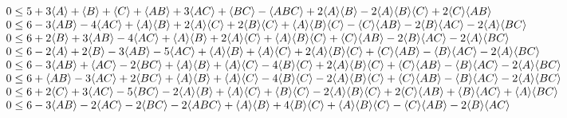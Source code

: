 \begin{align*}
\begin{array}{l}
 0
\leq
{5 + 3 \langle A\rangle + \langle B\rangle + \langle C\rangle + \langle A B\rangle + 3 \langle A C\rangle + \langle B C\rangle -\langle A B C\rangle + 2 \langle A\rangle \langle B\rangle -2 \langle A\rangle \langle B\rangle \langle C\rangle + 2 \langle C\rangle \langle A B\rangle} \\
 0
\leq
{6 -3 \langle A B\rangle -4 \langle A C\rangle + \langle A\rangle \langle B\rangle + 2 \langle A\rangle \langle C\rangle + 2 \langle B\rangle \langle C\rangle + \langle A\rangle \langle B\rangle \langle C\rangle -\langle C\rangle \langle A B\rangle -2 \langle B\rangle \langle A C\rangle -2 \langle A\rangle \langle B
   C\rangle} \\
 0
\leq
{6 + 2 \langle B\rangle + 3 \langle A B\rangle -4 \langle A C\rangle + \langle A\rangle \langle B\rangle + 2 \langle A\rangle \langle C\rangle + \langle A\rangle \langle B\rangle \langle C\rangle + \langle C\rangle \langle A B\rangle -2 \langle B\rangle \langle A C\rangle -2 \langle A\rangle \langle B C\rangle} \\
 0
\leq
{6 -2 \langle A\rangle + 2 \langle B\rangle -3 \langle A B\rangle -5 \langle A C\rangle + \langle A\rangle \langle B\rangle + \langle A\rangle \langle C\rangle + 2 \langle A\rangle \langle B\rangle \langle C\rangle + \langle C\rangle \langle A B\rangle -\langle B\rangle \langle A C\rangle -2 \langle A\rangle \langle B
   C\rangle} \\
 0
\leq
{6 -3 \langle A B\rangle + \langle A C\rangle -2 \langle B C\rangle + \langle A\rangle \langle B\rangle + \langle A\rangle \langle C\rangle -4 \langle B\rangle \langle C\rangle + 2 \langle A\rangle \langle B\rangle \langle C\rangle + \langle C\rangle \langle A B\rangle -\langle B\rangle \langle A C\rangle -2 \langle A\rangle
   \langle B C\rangle} \\
 0
\leq
{6 + \langle A B\rangle -3 \langle A C\rangle + 2 \langle B C\rangle + \langle A\rangle \langle B\rangle + \langle A\rangle \langle C\rangle -4 \langle B\rangle \langle C\rangle -2 \langle A\rangle \langle B\rangle \langle C\rangle + \langle C\rangle \langle A B\rangle -\langle B\rangle \langle A C\rangle -2 \langle A\rangle
   \langle B C\rangle} \\
 0
\leq
{6 + 2 \langle C\rangle + 3 \langle A C\rangle -5 \langle B C\rangle -2 \langle A\rangle \langle B\rangle + \langle A\rangle \langle C\rangle + \langle B\rangle \langle C\rangle -2 \langle A\rangle \langle B\rangle \langle C\rangle + 2 \langle C\rangle \langle A B\rangle + \langle B\rangle \langle A C\rangle + \langle A\rangle
   \langle B C\rangle} \\
 0
\leq
{6 -3 \langle A B\rangle -2 \langle A C\rangle -2 \langle B C\rangle -2 \langle A B C\rangle + \langle A\rangle \langle B\rangle + 4 \langle B\rangle \langle C\rangle + \langle A\rangle \langle B\rangle \langle C\rangle -\langle C\rangle \langle A B\rangle -2 \langle B\rangle \langle A C\rangle} \\
\end{array}
\end{align*}

\clearpage


\setlength{\bibsep}{3pt plus 3pt minus 2pt}

\nocite{apsrev41Control}



